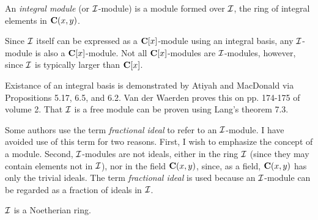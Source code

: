 
\setcounter{chapter}{8}



\vfill\eject
{}





An {\it integral module} (or ${\cal I}$-module) is a module formed
over ${\cal I}$, the ring of integral elements in ${\bf C}(x,y)$.

\enddefinition

Since ${\cal I}$ itself can be expressed as a ${\bf C}[x]$-module
using an integral basis, any ${\cal I}$-module is also a ${\bf
C}[x]$-module.  Not all ${\bf C}[x]$-modules are ${\cal I}$-modules,
however, since ${\cal I}$ is typically larger than ${\bf C}[x]$.

Existance of an integral basis is demonstrated by Atiyah and MacDonald
via Propositions 5.17, 6.5, and 6.2.  Van der Waerden proves this on
pp. 174-175 of volume 2.  That ${\cal I}$ is a free module can be
proven using Lang's theorem 7.3.

Some authors use the term {\it fractional ideal} to refer to an ${\cal
I}$-module.  I have avoided use of this term for two reasons.  First,
I wish to emphasize the concept of a module.  Second, ${\cal
I}$-modules are not ideals, either in the ring ${\cal I}$ (since they
may contain elements not in ${\cal I}$), nor in the field ${\bf
C}(x,y)$, since, as a field, ${\bf C}(x,y)$ has only the trivial
ideals.  The term {\it fractional ideal} is used because an ${\cal
I}$-module can be regarded as a fraction of ideals in ${\cal I}$.

\theorem ${\cal I}$ is a Noetherian ring.
\label{I is Noetherian}


